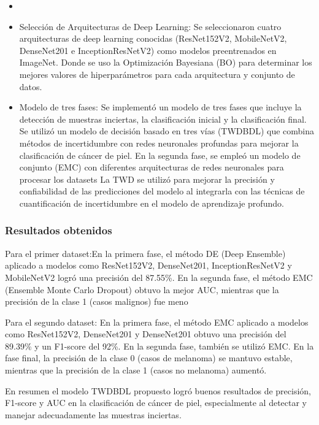\newcommand{\TUQStwo}{ Selección de Arquitecturas de Deep Learning: Se seleccionaron cuatro arquitecturas de deep learning conocidas (ResNet152V2, MobileNetV2, DenseNet201 e InceptionResNetV2) como modelos preentrenados en ImageNet. Donde se uso la Optimización Bayesiana (BO) para determinar los mejores valores de hiperparámetros para cada arquitectura y conjunto de datos.
 }

\newcommand{\TUQSthree}{Modelo de tres fases: Se implementó un modelo de tres fases que incluye la detección de muestras inciertas, la clasificación inicial y la clasificación final. Se utilizó un modelo de decisión basado en tres vías (TWDBDL) que combina métodos de incertidumbre con redes neuronales profundas para mejorar la clasificación de cáncer de piel. En la segunda fase, se empleó un modelo de conjunto (EMC) con diferentes arquitecturas de redes neuronales para procesar los datasets
La TWD se utilizó para mejorar la precisión y confiabilidad de las predicciones del modelo al integrarla con las técnicas de cuantificación de incertidumbre en el modelo de aprendizaje profundo.
}

\begin{itemize}
	\item \TUQSone
	\item \TUQStwo
	\item \TUQSthree

\end{itemize}



\subsubsection{Resultados obtenidos}
Para el primer dataset:En la primera fase, el método DE (Deep Ensemble) aplicado a modelos como ResNet152V2, DenseNet201, InceptionResNetV2 y MobileNetV2 logró una precisión del 87.55\%. En la segunda fase, el método EMC (Ensemble Monte Carlo Dropout) obtuvo la mejor AUC, mientras que la precisión de la clase 1 (casos malignos) fue meno

Para el segundo dataset: En la primera fase, el método EMC aplicado a modelos como ResNet152V2, DenseNet201 y DenseNet201 obtuvo una precisión del 89.39\% y un F1-score del 92\%. En la segunda fase, también se utilizó EMC. En la fase final, la precisión de la clase 0 (casos de melanoma) se mantuvo estable, mientras que la precisión de la clase 1 (casos no melanoma) aumentó.

En resumen el modelo TWDBDL propuesto logró buenos resultados de precisión, F1-score y AUC en la clasificación de cáncer de piel, especialmente al detectar y manejar adecuadamente las muestras inciertas.

